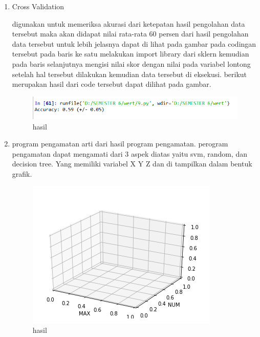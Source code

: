 \begin{enumerate}
\item Cross Validation\par
 digunakan untuk memeriksa akurasi dari ketepatan hasil pengolahan data tersebut maka akan didapat nilai rata-rata 60 persen dari hasil pengolahan data tersebut untuk lebih jelasnya dapat di lihat pada gambar pada codingan tersebut pada baris ke satu melakukan import library dari sklern kemudian pada baris selanjutnya mengisi nilai skor dengan nilai pada variabel lontong setelah hal tersebut dilakukan kemudian data tersebut di eksekusi. berikut merupakan hasil dari code tersebut dapat dilihat pada gambar.

\begin{figure}[ht]
\centering
\includegraphics[scale=0.5]{figures/1174031/3/10.PNG}
\caption{hasil}
\label{contoh}
\end{figure}

\item program pengamatan
arti dari hasil program pengamatan. perogram pengamatan dapat mengamati dari 3 aspek diatas yaitu svm, random, dan decision tree. Yang memiliki variabel X Y Z dan di tampilkan dalam bentuk grafik. 

\begin{figure}[ht]
\centering
\includegraphics[scale=0.5]{figures/1174031/3/11.PNG}
\caption{hasil}
\label{contoh}
\end{figure}
\end{enumerate}


